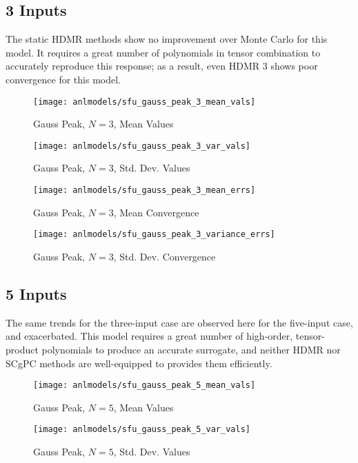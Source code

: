 \subsection{3 Inputs}
The static HDMR methods show no improvement over Monte Carlo for this model.  It
requires a great number of polynomials in tensor combination to accurately reproduce this response; as a
result, even HDMR 3 shows poor convergence for this model.
\begin{figure}[H]
  \centering
  \texttt{[image: anlmodels/sfu\_gauss\_peak\_3\_mean\_vals]}
  \caption{Gauss Peak, $N=3$, Mean Values}
  \label{fig:gauss peak mean values 3}
\end{figure}
\begin{figure}[H]
  \centering
  \texttt{[image: anlmodels/sfu\_gauss\_peak\_3\_var\_vals]}
  \caption{Gauss Peak, $N=3$, Std. Dev. Values}
  \label{fig:gauss peak var values 3}
\end{figure}

\begin{figure}[H]
  \centering
  \texttt{[image: anlmodels/sfu\_gauss\_peak\_3\_mean\_errs]}
  \caption{Gauss Peak, $N=3$, Mean Convergence}
  \label{fig:gauss peak mean errors 3}
\end{figure}
\begin{figure}[H]
  \centering
  \texttt{[image: anlmodels/sfu\_gauss\_peak\_3\_variance\_errs]}
  \caption{Gauss Peak, $N=3$, Std. Dev. Convergence}
  \label{fig:gauss peak var errors 3}
\end{figure}

\subsection{5 Inputs}
The same trends for the three-input case are observed here for the five-input case, and exacerbated.  This
model requires a great number of high-order, tensor-product polynomials to produce an accurate surrogate, and
neither HDMR nor SCgPC methods are well-equipped to provides them efficiently.
\begin{figure}[H]
  \centering
  \texttt{[image: anlmodels/sfu\_gauss\_peak\_5\_mean\_vals]}
  \caption{Gauss Peak, $N=5$, Mean Values}
  \label{fig:gauss peak mean values 5}
\end{figure}
\begin{figure}[H]
  \centering
  \texttt{[image: anlmodels/sfu\_gauss\_peak\_5\_var\_vals]}
  \caption{Gauss Peak, $N=5$, Std. Dev. Values}
  \label{fig:gauss peak var values 5}
\end{figure}

